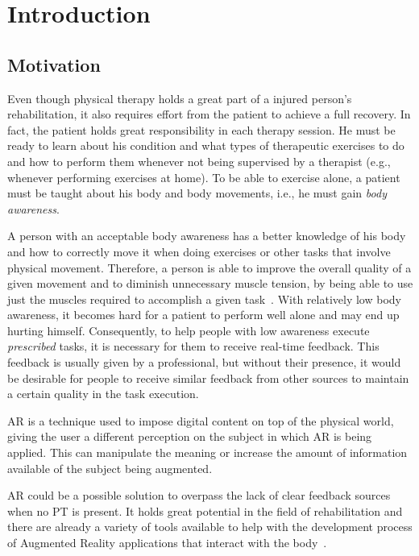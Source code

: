 \chapter{Introduction}
\label{sec:intro}

\section{Motivation}

Even though physical therapy holds a great part of a injured person's rehabilitation, 
it also requires effort from the patient to achieve a full recovery.
In fact, the patient holds great responsibility in each therapy session.
He must be ready to learn about his condition and what types of therapeutic exercises 
to do and how to perform them whenever not being supervised by a therapist (e.g., whenever performing exercises at home).
To be able to exercise alone, a patient must be taught about his body and body 
movements, i.e., he must gain \emph{body awareness}.

A person with an acceptable body awareness has a better knowledge of his body and how to correctly move it when doing exercises or other tasks that involve physical movement.
Therefore, a person is able to improve the overall quality of a given movement and to diminish unnecessary muscle tension, 
by being able to use just the muscles required to accomplish a given task~\cite{Singh2014a}.
With relatively low body awareness, it becomes hard for a patient to perform well alone and may 
end up hurting himself. 
Consequently, to help people with low awareness 
execute \textit{prescribed} tasks, it is necessary for them to receive real-time feedback.
This feedback is usually given by a professional, 
but without their presence, it would be desirable for people to receive similar feedback from other sources to maintain a certain quality in the task execution.

\ac{AR} is a technique used to impose digital content on top of the physical world, giving the user a different perception on the subject in which \ac{AR} is being applied. 
This can manipulate the meaning or increase the amount of information available of the subject being augmented.

\ac{AR} could be a possible solution to overpass the lack of clear feedback sources when no \ac{PT} is present.
It holds great potential in the field of rehabilitation %
and there are already a variety of tools available to help with the development process of Augmented
Reality applications that interact with the body~\cite{Gama2012a}.

